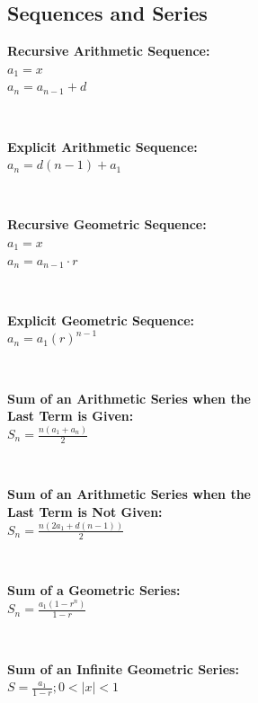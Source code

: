\subsection*{Sequences and Series}
\begin{minipage}{\textwidth}
    \textbf{Recursive Arithmetic Sequence:}
    \\ \( a_1 = x \)
    \\ \( a_n = a_{n - 1} + d \)
\end{minipage}
\\ \begin{minipage}{\textwidth}
    \textbf{Explicit Arithmetic Sequence:}
    \\ \( a_n = d( n - 1 ) + a_1 \)
\end{minipage}
\\ \begin{minipage}{\textwidth}
    \textbf{Recursive Geometric Sequence:}
    \\ \( a_1 = x \)
    \\ \( a_n = a_{n - 1} \cdot r \)
\end{minipage}
\\ \begin{minipage}{\textwidth}
    \textbf{Explicit Geometric Sequence:}
    \\ \( a_n = a_1 ( r )^{n - 1} \)
\end{minipage}
\\ \begin{minipage}{\textwidth}
    \textbf{Sum of an Arithmetic Series when the \\Last Term is Given:}
    \\ \( S_n = \displaystyle\frac{ n( a_1 + a_n ) }{ 2 } \)
\end{minipage}
\\ \begin{minipage}{\textwidth}
    \textbf{Sum of an Arithmetic Series when the \\Last Term is Not Given:}
    \\ \( S_n = \displaystyle\frac{ n( 2a_1 + d( n - 1 ) ) }{ 2 } \)
\end{minipage}
\\ \begin{minipage}{\textwidth}
    \textbf{Sum of a Geometric Series:}
    \\ \( S_n = \displaystyle\frac{ a_1 ( 1 - r^n ) }{ 1 - r } \)
\end{minipage}
\\ \begin{minipage}{\textwidth}
    \textbf{Sum of an Infinite Geometric Series:}
    \\ \( S = \displaystyle\frac{ a_1 }{ 1 - r } ; 0 < | x | < 1 \)
\end{minipage}

